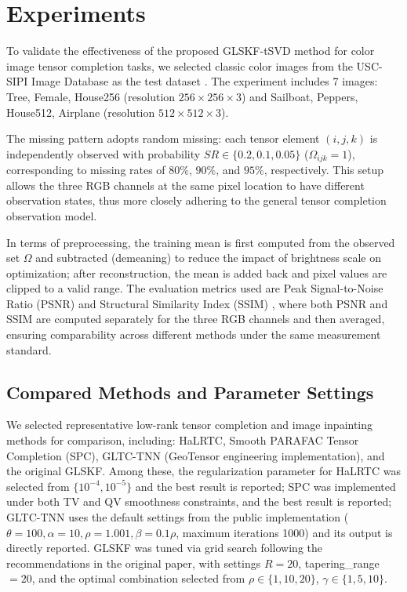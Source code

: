 \documentclass[a4paper,12pt]{article}
\numberwithin{equation}{section}
\numberwithin{algorithm}{section}
\theoremstyle{remark}
\theoremstyle{definition}
\begin{document}
\section{Experiments}
To validate the effectiveness of the proposed GLSKF-tSVD method for color image tensor completion tasks, we selected classic color images from the USC-SIPI Image Database as the test dataset \cite{usc_sipi_database}.
The experiment includes 7 images: Tree, Female, House256 (resolution $256\times256\times3$) and Sailboat, Peppers, House512, Airplane (resolution $512\times512\times3$).

The missing pattern adopts random missing: each tensor element $(i,j,k)$ is independently observed with probability $SR \in \{0.2, 0.1, 0.05\}$ ($\Omega_{ijk}=1$), corresponding to missing rates of $80\%$, $90\%$, and $95\%$, respectively. This setup allows the three RGB channels at the same pixel location to have different observation states, thus more closely adhering to the general tensor completion observation model.

In terms of preprocessing, the training mean is first computed from the observed set $\Omega$ and subtracted (demeaning) to reduce the impact of brightness scale on optimization; after reconstruction, the mean is added back and pixel values are clipped to a valid range.
The evaluation metrics used are Peak Signal-to-Noise Ratio (PSNR) and Structural Similarity Index (SSIM) \cite{wang2004ssim}, where both PSNR and SSIM are computed separately for the three RGB channels and then averaged, ensuring comparability across different methods under the same measurement standard.

\subsection{Compared Methods and Parameter Settings}
We selected representative low-rank tensor completion and image inpainting methods for comparison, including: HaLRTC\cite{liu2013tensor}, Smooth PARAFAC Tensor Completion (SPC)\cite{yokota2016smooth}, GLTC-TNN (GeoTensor engineering implementation)\cite{chen2025geotensor}, and the original GLSKF\cite{lei2024glskf}.
Among these, the regularization parameter for HaLRTC was selected from $\{10^{-4},10^{-5}\}$ and the best result is reported; SPC was implemented under both TV and QV smoothness constraints, and the best result is reported;
GLTC-TNN uses the default settings from the public implementation ($\theta=100,\alpha=10,\rho=1.001,\beta=0.1\rho$, maximum iterations 1000) and its output is directly reported\cite{chen2025geotensor}.
GLSKF was tuned via grid search following the recommendations in the original paper, with settings $R=20$, tapering\_range$=20$, and the optimal combination selected from $\rho\in\{1,10,20\}$, $\gamma\in\{1,5,10\}$\cite{lei2024glskf}.
\end{document}
